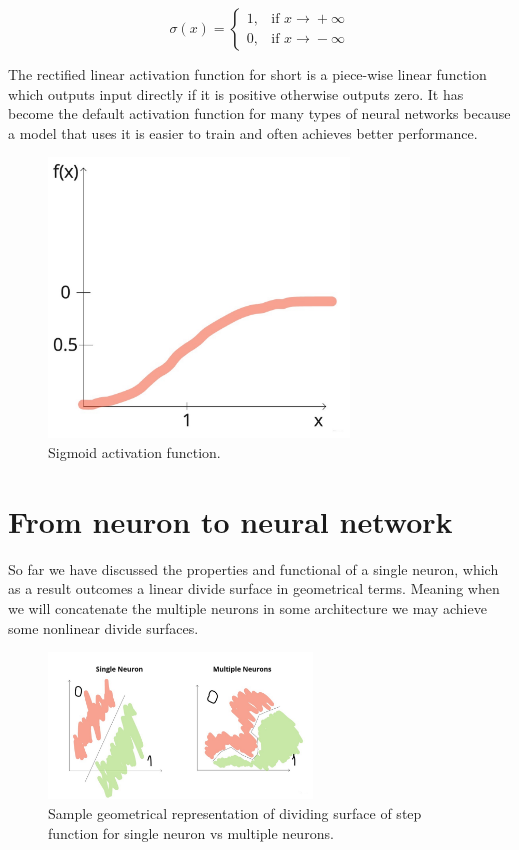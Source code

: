 \[ \sigma(x) = \begin{cases} 1, & \mbox{if } x\mbox{$\xrightarrow{} + \infty$} \\ 0, & \mbox{if } x\mbox{$\xrightarrow{} - \infty$} \end{cases} \]

The rectified linear activation function for short is a piece-wise linear function which outputs input directly if it is positive otherwise outputs zero. It has become the default activation function for many types of neural networks because a model that uses it is easier to train and often achieves better performance.

\begin{figure}[h]
    \centering \includegraphics[width=8cm]{images/sigmoid_function.jpg}
    \caption {Sigmoid activation function.}
\end{figure}

\section{From neuron to neural network}
So far we have discussed the properties and functional of a single neuron, which as a result outcomes a linear divide surface in geometrical terms. Meaning when we will concatenate the multiple neurons in some architecture we may achieve some nonlinear divide surfaces.
\begin{figure}[h]
    \centering \includegraphics[width=7cm]{images/neuron_to_neural_net.jpg}
    \caption {Sample geometrical representation of dividing surface of step function for single neuron vs multiple neurons.}
\end{figure}

